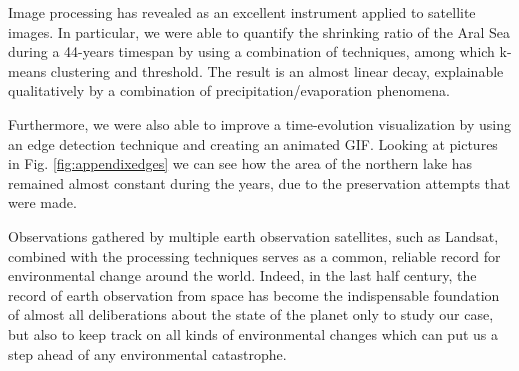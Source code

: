 Image processing has revealed as an excellent instrument applied to satellite images. 
In particular, we were able to quantify the shrinking ratio of the Aral Sea during a 44-years timespan by using a combination of techniques, among which k-means clustering and threshold. 
The result is an almost linear decay, explainable qualitatively by a combination of precipitation/evaporation phenomena.

Furthermore, we were also able to improve a time-evolution visualization by using an edge detection technique and creating an animated GIF.
Looking at pictures in Fig. \ref{fig:appendixedges} we can see how the area of the northern lake has remained almost constant during the years, due to the preservation attempts that were made. 

Observations gathered by multiple earth observation satellites, such as Landsat, combined with the processing techniques serves as a common, reliable record for environmental change around the world. 
Indeed, in the last half century, the record of earth observation from space has become the indispensable foundation of almost all deliberations about the state of the planet only to study our case, but also to keep track on all kinds of environmental changes which can put us a step ahead of any environmental catastrophe.
